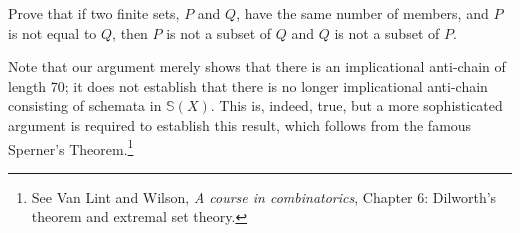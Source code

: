 \begin{aside}
    Prove that if two finite sets, $P$ and $Q$, have the same number of members, and $P$ is not equal to $Q$, then $P$ is not a subset of $Q$ and $Q$ is not a subset of $P$.
\end{aside}

Note that our argument merely shows that there is an implicational anti-chain of length 70; it does not establish that there is no longer implicational anti-chain consisting of schemata in $\mathbb{S}(X)$. This is, indeed, true, but a more sophisticated argument is required to establish this result, which follows from the famous Sperner's Theorem.\footnote{See Van Lint and Wilson, \emph{A course in combinatorics}, Chapter 6: Dilworth's theorem and extremal set theory.}